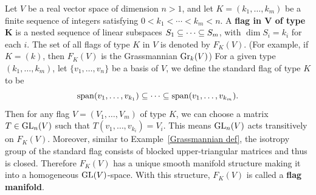 \begin{example}
Let $V$ be a real vector space of dimension $n>1$, and let $K=(k_1,\dots,k_m)$ be a finite sequence of integers satisfying $0<k_1<\cdots<k_m<n$. A 
\textbf{flag in $\bm{V}$ of type $\bm{K}$} is a nested sequence of linear subspaces $S_1\subseteq\cdots\subseteq S_m$, with $\dim S_i=k_i$ for each $i$. The set of all flags of 
type $K$ in $V$ is denoted by $F_K(V)$. (For example, if $K=(k)$, then $F_K(V)$ is the Grassmannian $\mathrm{Gr}_k(V)$) For a given type $(k_1,\dots,k_m)$, let 
$\{v_1,\dots,v_n\}$ be a basis of $V$, we define the standard flag of type $K$ to be
\[\mathrm{span}(v_1,\dots,v_{k_1})\subseteq\cdots\subseteq\mathrm{span}(v_1,\dots,v_{k_m}).\]
Then for any flag $V=(V_1,\dots,V_m)$ of type $K$, we can choose a matrix $T\in\mathrm{GL}_n(V)$ such that $T(v_1,\dots,v_{k_i})=V_i$. This means $\mathrm{GL}_n(V)$ acts transitively 
on $F_K(V)$. Moreover, similar to Example~\ref{Grassmannian def}, the isotropy group of the standard flag consists of blocked upper-triangular matrices and thus is closed. Therefore $F_K(V)$ has a unique smooth manifold structure making it into a homogeneous $\mathrm{GL}(V)$-space. With this structure, $F_K(V)$ is called a \textbf{flag manifold}.
\end{example}
